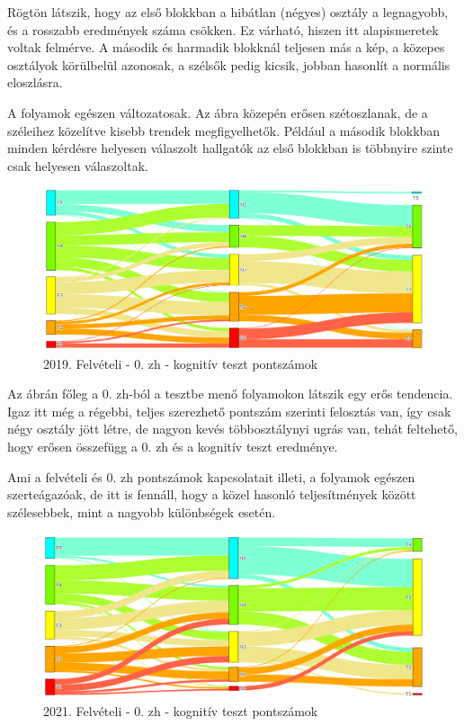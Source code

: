 \documentclass[12pt]{article}
\begin{document}
Rögtön látszik, hogy az első blokkban a hibátlan (négyes) osztály a legnagyobb, és a rosszabb eredmények száma csökken. Ez várható, hiszen itt alapismeretek voltak felmérve. A második és harmadik blokknál teljesen más a kép, a közepes osztályok körülbelül azonosak, a szélsők pedig kicsik, jobban hasonlít a normális eloszlásra.

A folyamok egészen változatosak. Az ábra közepén erősen szétoszlanak, de a széleihez közelítve kisebb trendek megfigyelhetők. Például a második blokkban minden kérdésre helyesen válaszolt hallgatók az első blokkban is többnyire szinte csak helyesen válaszoltak.

\begin{figure}[H]
\centering
\includegraphics[scale=0.573]{kepek/2019_old_felvi_0zh_teszt.png}
\caption{2019. Felvételi - 0. zh - kognitív teszt pontszámok}
\label{fig:2019_old_felvi_0zh_teszt}
\end{figure}

Az ábrán főleg a 0. zh-ból a tesztbe menő folyamokon látszik egy erős tendencia. Igaz itt még a régebbi, teljes szerezhető pontszám szerinti felosztás van, így csak négy osztály jött létre, de nagyon kevés többosztálynyi ugrás van, tehát feltehető, hogy erősen összefügg a 0. zh és a kognitív teszt eredménye.

Ami a felvételi és 0. zh pontszámok kapcsolatait illeti, a folyamok egészen szerteágazóak, de itt is fennáll, hogy a közel hasonló teljesítmények között szélesebbek, mint a nagyobb különbségek esetén.

\begin{figure}[H]
\centering
\includegraphics[scale=0.573]{kepek/2021_old_felvi_0zh_teszt.png}
\caption{2021. Felvételi - 0. zh - kognitív teszt pontszámok}
\label{fig:2021_old_felvi_0zh_teszt}
\end{figure}
\end{document}
